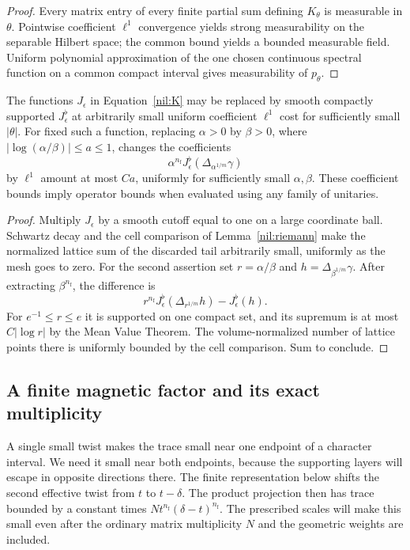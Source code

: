 \begin{proof}
Every matrix entry of every finite partial sum defining
\(K_\theta\) is measurable in \(\theta\). Pointwise
coefficient \(\ell^1\) convergence yields strong measurability
on the separable Hilbert space; the common bound yields a
bounded measurable field. Uniform polynomial approximation
of the one chosen continuous spectral function on a common
compact interval gives measurability of \(p_\theta\).
\end{proof}

\begin{lemma}\label{nil:templates}
The functions \(J_\epsilon\) in Equation~\ref{nil:K} may be
replaced by smooth compactly supported \(J_\epsilon^\flat\)
at arbitrarily small uniform coefficient \(\ell^1\) cost
for sufficiently small \(|\theta|\).
For fixed such a function, replacing \(\alpha>0\) by \(\beta>0\),
where \(|\log(\alpha/\beta)|\le a\le1\), changes the coefficients
\[
 \alpha^{n_{\mathrm f}}
     J_\epsilon^\flat(\Delta_{\alpha^{1/m}}\gamma)
\]
by \(\ell^1\) amount at most \(Ca\), uniformly for sufficiently
small \(\alpha,\beta\). These coefficient bounds imply operator
bounds when evaluated using any family of unitaries.
\end{lemma}

\begin{proof}
Multiply \(J_\epsilon\) by a smooth cutoff equal to one on a
large coordinate ball. Schwartz decay and the cell comparison
of Lemma~\ref{nil:riemann} make the normalized lattice sum of
the discarded tail arbitrarily small, uniformly as the mesh
goes to zero. For the second assertion set \(r=\alpha/\beta\)
and \(h=\Delta_{\beta^{1/m}}\gamma\). After extracting
\(\beta^{n_{\mathrm f}}\), the difference is
\[
 r^{n_{\mathrm f}}J_\epsilon^\flat(\Delta_{r^{1/m}}h)
                       -J_\epsilon^\flat(h).
\]
For \(e^{-1}\le r\le e\) it is supported on one compact set,
and its supremum is at most \(C|\log r|\) by the Mean Value
Theorem. The volume-normalized number of lattice points there
is uniformly bounded by the cell comparison. Sum to conclude.
\end{proof}

\subsection{A finite magnetic factor and its exact multiplicity}

A single small twist makes the trace small near one endpoint of a
character interval. We need it small near both endpoints, because the
supporting layers will escape in opposite directions there. The finite
representation below shifts the second effective twist from \(t\) to
\(t-\delta\). The product projection then has trace bounded by a
constant times \(N t^{n_{\mathrm f}}(\delta-t)^{n_{\mathrm f}}\).
The prescribed scales will make this small even after the ordinary
matrix multiplicity \(N\) and the geometric weights are included.


